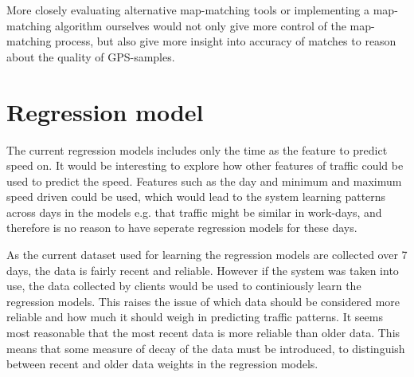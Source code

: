 More closely evaluating alternative map-matching tools or implementing a map-matching algorithm ourselves would not only give more control of the map-matching process, but also give more insight into accuracy of matches to reason about the quality of GPS-samples. 


\section{Regression model}
The current regression models includes only the time as the feature to predict speed on. It would be interesting to explore how other features of traffic could be used to predict the speed. Features such as the day and minimum and maximum speed driven could be used, which would lead to the system learning patterns across days in the models e.g.  that traffic might be similar in work-days, and therefore is no reason to have seperate regression models for these days. 

As the current dataset used for learning the regression models are collected over 7 days, the data is fairly recent and reliable. However if the system was taken into use, the data collected by clients would be used to continiously learn the regression models. This raises the issue of which data should be considered more reliable and how much it should weigh in predicting traffic patterns. It seems most reasonable that the most recent data is more reliable than older data. This means that some measure of decay of the data must be introduced, to distinguish between recent and older data weights in the regression models.

